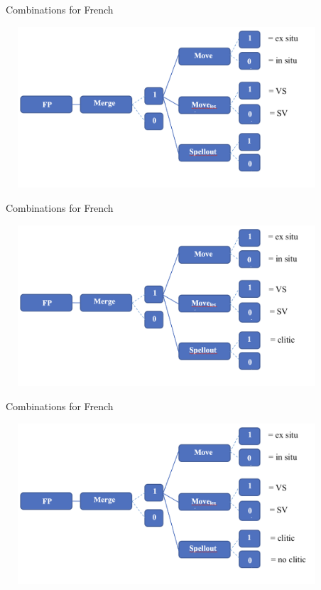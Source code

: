\documentclass[lesson_slides]{subfiles}
\begin{document}
\begin{frame}[c]{Combinations for French}

    \begin{center}
        \includegraphics[width=12cm, height=6cm]{images/combinationsfrench4.png}
    \end{center}

\end{frame}
\begin{frame}[c]{Combinations for French}

    \begin{center}
        \includegraphics[width=12cm, height=6cm]{images/combinationsfrench5.png}
    \end{center}

\end{frame}
\begin{frame}[c]{Combinations for French}

    \begin{center}
        \includegraphics[width=12cm, height=6cm]{images/combinationsfrench6.png}
    \end{center}

\end{frame}
\end{document}
